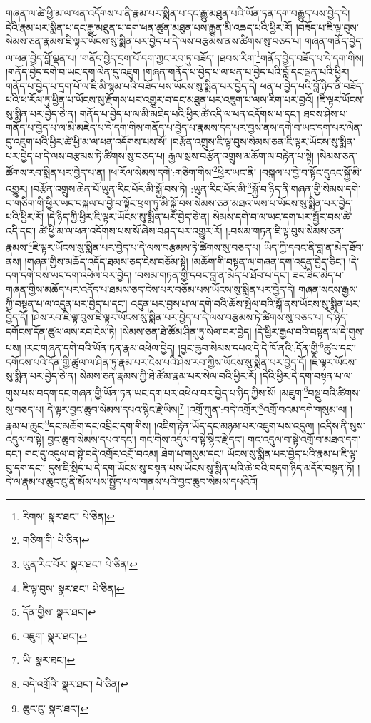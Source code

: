 གཞན་ལ་ཚེ་ཕྱི་མ་ལ་ཕན་འདོགས་པ་ནི་རྣམ་པར་སྨིན་པ་དང་རྒྱུ་མཐུན་པའི་ཡོན་ཏན་དག་བརྒྱུད་པས་བྱེད་དེ། དེའི་རྣམ་པར་སྨིན་པ་དང་རྒྱུ་མཐུན་པ་དག་ཕན་ཚུན་མཐུན་པས་རྒྱུན་མི་འཆད་པའི་ཕྱིར་རོ། །བཟོད་པ་ཇི་ལྟ་བུས་སེམས་ཅན་རྣམས་ཇི་ལྟར་ཡོངས་སུ་སྨིན་པར་བྱེད་པ་དེ་ལས་བརྩམས་ནས་ཚིགས་སུ་བཅད་པ། གཞན་གནོད་བྱེད་ལ་ཕན་བྱེད་བློ་ལྡན་པ། །གནོད་བྱེད་དྲག་པོ་དག་ཀྱང་རབ་ཏུ་བཟོད། །ཐབས་རིག་\footnote{རིགས་  སྣར་ཐང་།  པེ་ཅིན། }གནོད་བྱེད་བཟོད་པ་དེ་དག་གིས། །གནོད་བྱེད་དགེ་བ་ཡང་དག་ལེན་དུ་འཇུག །གཞན་གནོད་པ་བྱེད་པ་ལ་ཕན་པ་བྱེད་པའི་བློ་དང་ལྡན་པའི་ཕྱིར། གནོད་པ་བྱེད་པ་དྲག་པོ་ལ་ཇི་མི་སྙམ་པའི་བཟོད་པས་ཡོངས་སུ་སྨིན་པར་བྱེད་དེ། ཕན་པ་བྱེད་པའི་བློ་ཉིད་ནི་བཟོད་པའི་ཕ་རོལ་ཏུ་ཕྱིན་པ་ཡོངས་སུ་རྫོགས་པར་འགྱུར་བ་དང་མཐུན་པར་འཇུག་པ་ལས་རིག་པར་བྱའོ། །ཇི་ལྟར་ཡོངས་སུ་སྨིན་པར་བྱེད་ཅེ་ན། གནོད་པ་བྱེད་པ་ལ་མི་མཇེད་པའི་ཕྱིར་ཚེ་འདི་ལ་ཕན་འདོགས་པ་དང་། ཐབས་ཤེས་པ་གནོད་པ་བྱེད་པ་ལ་མི་མཇེད་པ་དེ་དག་གིས་གནོད་པ་བྱེད་པ་རྣམས་དད་པར་བྱས་ནས་དགེ་བ་ཡང་དག་པར་ལེན་དུ་འཇུག་པའི་ཕྱིར་ཚེ་ཕྱི་མ་ལ་ཕན་འདོགས་པས་སོ། །བརྩོན་འགྲུས་ཇི་ལྟ་བུས་སེམས་ཅན་ཇི་ལྟར་ཡོངས་སུ་སྨིན་པར་བྱེད་པ་དེ་ལས་བརྩམས་ཏེ་ཚིགས་སུ་བཅད་པ། རྒྱལ་སྲས་བརྩོན་འགྲུས་མཆོག་ལ་བརྟེན་པ་སྟེ། །སེམས་ཅན་ཚོགས་རབ་སྨིན་པར་བྱེད་པ་ན། །ཕ་རོལ་སེམས་དགེ་:གཅིག་གིས་\footnote{གཅིག་གི་  པེ་ཅིན། }ཕྱིར་ཡང་ནི། །བསྐལ་པ་བྱེ་བ་སྟོང་དུའང་སྐྱོ་མི་འགྱུར། །བརྩོན་འགྲུས་ཆེན་པོ་ཡུན་རིང་པོར་མི་སྐྱོ་བས་ཏེ། :ཡུན་རིང་པོར་མི་\footnote{ཡུན་རིང་པོར་  སྣར་ཐང་།  པེ་ཅིན། }སྐྱོ་བ་ཉིད་ནི་གཞན་གྱི་སེམས་དགེ་བ་གཅིག་གི་ཕྱིར་ཡང་བསྐལ་པ་བྱེ་བ་སྟོང་ཕྲག་ཏུ་མི་སྐྱོ་བས་སེམས་ཅན་མཐའ་ཡས་པ་ཡོངས་སུ་སྨིན་པར་བྱེད་པའི་ཕྱིར་རོ། །དེ་ཉིད་ཀྱི་ཕྱིར་ཇི་ལྟར་ཡོངས་སུ་སྨིན་པར་བྱེད་ཅེ་ན། སེམས་དགེ་བ་ལ་ཡང་དག་པར་སྦྱོར་བས་ཚེ་འདི་དང་། ཚེ་ཕྱི་མ་ལ་ཕན་འདོགས་པས་སོ་ཞེས་བཤད་པར་འགྱུར་རོ། །:བསམ་གཏན་ཇི་ལྟ་བུས་སེམས་ཅན་རྣམས་\footnote{ཇི་ལྟ་བུས་  སྣར་ཐང་།  པེ་ཅིན། }ཇི་ལྟར་ཡོངས་སུ་སྨིན་པར་བྱེད་པ་དེ་ལས་བརྩམས་ཏེ་ཚིགས་སུ་བཅད་པ། ཡིད་ཀྱི་དབང་ནི་བླ་ན་མེད་ཐོབ་ནས། །གཞན་གྱིས་མཆོད་འདོད་ཐམས་ཅད་ངེས་བཅོམ་སྟེ། །མཆོག་གི་བསྟན་ལ་གཞན་དག་འདུན་བྱེད་ཅིང་། །དེ་དག་དགེ་བས་ཡང་དག་འཕེལ་བར་བྱེད། །བསམ་གཏན་གྱི་དབང་བླ་ན་མེད་པ་ཐོབ་པ་དང་། ཟང་ཟིང་མེད་པ་གཞན་གྱིས་མཆོད་པར་འདོད་པ་ཐམས་ཅད་ངེས་པར་བཅོམ་པས་ཡོངས་སུ་སྨིན་པར་བྱེད་དེ། གཞན་སངས་རྒྱས་ཀྱི་བསྟན་པ་ལ་འདུན་པར་བྱེད་པ་དང་། འདུན་པར་བྱས་པ་ལ་དགེ་བའི་ཆོས་སྤེལ་བའི་སྒོ་ནས་ཡོངས་སུ་སྨིན་པར་བྱེད་དོ། །ཤེས་རབ་ཇི་ལྟ་བུས་ཇི་ལྟར་ཡོངས་སུ་སྨིན་པར་བྱེད་པ་དེ་ལས་བརྩམས་ཏེ་ཚིགས་སུ་བཅད་པ། དེ་ཉིད་དགོངས་དོན་ཚུལ་ལས་རབ་ངེས་ཏེ། །སེམས་ཅན་ཐེ་ཚོམ་ཤིན་ཏུ་སེལ་བར་བྱེད། །དེ་ཕྱིར་རྒྱལ་བའི་བསྟན་ལ་དེ་གུས་པས། །རང་གཞན་དགེ་བའི་ཡོན་ཏན་རྣམ་འཕེལ་བྱེད། །བྱང་ཆུབ་སེམས་དཔའ་དེ་དེ་ཁོ་ནའི་:དོན་གྱི་\footnote{དོན་གྱིས་  སྣར་ཐང་། }ཚུལ་དང་། དགོངས་པའི་དོན་གྱི་ཚུལ་ལ་ཤིན་ཏུ་རྣམ་པར་ངེས་པའི་ཤེས་རབ་ཀྱིས་ཡོངས་སུ་སྨིན་པར་བྱེད་དོ། །ཇི་ལྟར་ཡོངས་སུ་སྨིན་པར་བྱེད་ཅེ་ན། སེམས་ཅན་རྣམས་ཀྱི་ཐེ་ཚོམ་རྣམ་པར་སེལ་བའི་ཕྱིར་རོ། །དེའི་ཕྱིར་དེ་དག་བསྟན་པ་ལ་གུས་པས་བདག་དང་གཞན་གྱི་ཡོན་ཏན་ཡང་དག་པར་འཕེལ་བར་བྱེད་པ་ཉིད་ཀྱིས་སོ། །མཇུག་\footnote{འཇུག་  སྣར་ཐང་། }བསྡུ་བའི་ཚིགས་སུ་བཅད་པ། དེ་ལྟར་བྱང་ཆུབ་སེམས་དཔའ་སྙིང་རྗེ་ཡིས།\footnote{ཡི།  སྣར་ཐང་། } །འགྲོ་ཀུན་:བདེ་འགྲོར་\footnote{བདེ་འགྲོའི་  སྣར་ཐང་།  པེ་ཅིན། }འགྲོ་བའམ་དགེ་གསུམ་ལ། །རྣམ་པ་ཆུང་\footnote{ཆུང་ངུ་  སྣར་ཐང་། }དང་མཆོག་དང་འབྲིང་དག་གིས། །འཇིག་རྟེན་ཡོད་དང་མཉམ་པར་འཇུག་པས་འདུལ། །འདིས་ནི་སུས་འདུལ་བ་སྟེ། བྱང་ཆུབ་སེམས་དཔའ་དང་། གང་གིས་འདུལ་བ་སྟེ་སྙིང་རྗེ་དང་། གང་འདུལ་བ་སྟེ་འགྲོ་བ་མཐའ་དག་དང་། གང་དུ་འདུལ་བ་སྟེ་བདེ་འགྲོར་འགྲོ་བའམ། ཐེག་པ་གསུམ་དང་། ཡོངས་སུ་སྨིན་པར་བྱེད་པའི་རྣམ་པ་ཇི་ལྟ་བུ་དག་དང་། དུས་ཇི་སྲིད་པ་དེ་དག་ཡོངས་སུ་བསྟན་པས་ཡོངས་སུ་སྨིན་པའི་ཆེ་བའི་བདག་ཉིད་མདོར་བསྟན་ཏོ། །དེ་ལ་རྣམ་པ་ཆུང་ངུ་ནི་མོས་པས་སྤྱོད་པ་ལ་གནས་པའི་བྱང་ཆུབ་སེམས་དཔའིའོ། 